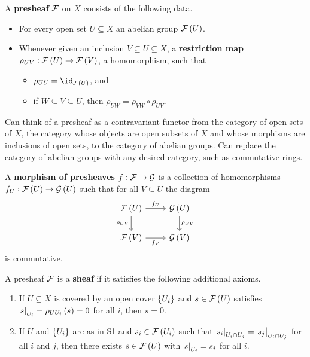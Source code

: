 \begin{definition*}
A \textbf{presheaf} $ \mathcal{F} $ on $ X $ consists of the following data.
\begin{itemize}
\item For every open set $ U \subseteq X $ an abelian group $ \FFF\br{U} $.
\item Whenever given an inclusion $ V \subseteq U \subseteq X $, a \textbf{restriction map} $ \rho_{UV} : \FFF\br{U} \to \FFF\br{V} $, a homomorphism, such that
\begin{itemize}
\item $ \rho_{UU} = \id_{\FFF\br{U}} $, and
\item if $ W \subseteq V \subseteq U $, then $ \rho_{UW} = \rho_{VW} \circ \rho_{UV} $.
\end{itemize}
\end{itemize}
\end{definition*}

\begin{remark*}
Can think of a presheaf as a contravariant functor from the category of open sets of $ X $, the category whose objects are open subsets of $ X $ and whose morphisms are inclusions of open sets, to the category of abelian groups. Can replace the category of abelian groups with any desired category, such as commutative rings.
\end{remark*}

\begin{definition*}
A \textbf{morphism of presheaves} $ f : \mathcal{F} \to \mathcal{G} $ is a collection of homomorphisms $ f_U : \FFF\br{U} \to \GGG\br{U} $ such that for all $ V \subseteq U $ the diagram
$$
\begin{tikzcd}
\FFF\br{U} \arrow{r}{f_U} \arrow{d}[swap]{\rho_{UV}} & \GGG\br{U} \arrow{d}{\rho_{UV}} \\
\FFF\br{V} \arrow{r}[swap]{f_V} & \GGG\br{V}
\end{tikzcd}
$$
is commutative.
\end{definition*}

\begin{definition*}
A presheaf $ \mathcal{F} $ is a \textbf{sheaf} if it satisfies the following additional axioms.
\begin{enumerate}[label=S\arabic*.]
\item If $ U \subseteq X $ is covered by an open cover $ \cbr{U_i} $ and $ s \in \FFF\br{U} $ satisfies $ \eval{s}_{U_i} = \rho_{UU_i}\br{s} = 0 $ for all $ i $, then $ s = 0 $.
\item If $ U $ and $ \cbr{U_i} $ are as in S1 and $ s_i \in \FFF\br{U_i} $ such that $ \left. s_i \right|_{U_i \cap U_j} = \left. s_j \right|_{U_i \cap U_j} $ for all $ i $ and $ j $, then there exists $ s \in \FFF\br{U} $ with $ \left. s \right|_{U_i} = s_i $ for all $ i $.
\end{enumerate}
\end{definition*}

